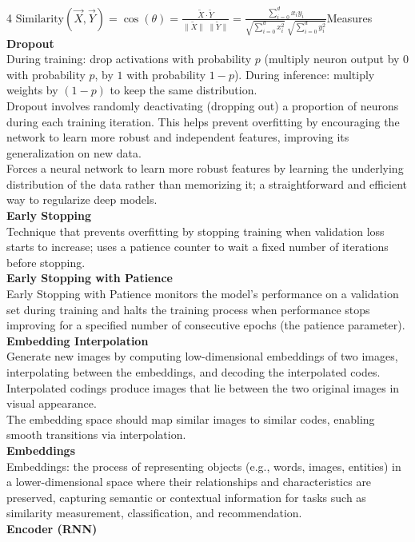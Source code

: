 \documentclass[8pt]{extarticle}
\begin{document}
\begin{multicols}{4}
$\text{Similarity}(\vec{X},\vec{Y}) = \cos(\theta) = \frac{\tilde{X}\cdot\tilde{Y}}{\|\tilde{X}\|\;\|\tilde{Y}\|} = \frac{\sum_{i=0}^{d} x_i y_i}{\sqrt{\sum_{i=0}^{d} x_i^{2}} \; \sqrt{\sum_{i=0}^{d} y_i^{2}}}$\Distance Measures\\
\vspace{2pt}\textbf{Dropout}\\
During training: drop activations with probability $p$ (multiply neuron output by $0$ with probability $ p$, by $1$ with probability $1-p$). During inference: multiply weights by $(1-p)$ to keep the same distribution.\\
Dropout involves randomly deactivating (dropping out) a proportion of neurons during each training iteration. This helps prevent overfitting by encouraging the network to learn more robust and independent features, improving its generalization on new data.\\
Forces a neural network to learn more robust features by learning the underlying distribution of the data rather than memorizing it; a straightforward and efficient way to regularize deep models.\\
\vspace{2pt}\textbf{Early Stopping}\\
Technique that prevents overfitting by stopping training when validation loss starts to increase; uses a patience counter to wait a fixed number of iterations before stopping.\\
\vspace{2pt}\textbf{Early Stopping with Patience}\\
Early Stopping with Patience monitors the model's performance on a validation set during training and halts the training process when performance stops improving for a specified number of consecutive epochs (the patience parameter).\\
\vspace{2pt}\textbf{Embedding Interpolation}\\
Generate new images by computing low-dimensional embeddings of two images, interpolating between the embeddings, and decoding the interpolated codes.\\
Interpolated codings produce images that lie between the two original images in visual appearance.\\
The embedding space should map similar images to similar codes, enabling smooth transitions via interpolation.\\
\vspace{2pt}\textbf{Embeddings}\\
Embeddings: the process of representing objects (e.g., words, images, entities) in a lower-dimensional space where their relationships and characteristics are preserved, capturing semantic or contextual information for tasks such as similarity measurement, classification, and recommendation.\\
\vspace{2pt}\textbf{Encoder (RNN)}\\


\end{multicols}
\end{document}
